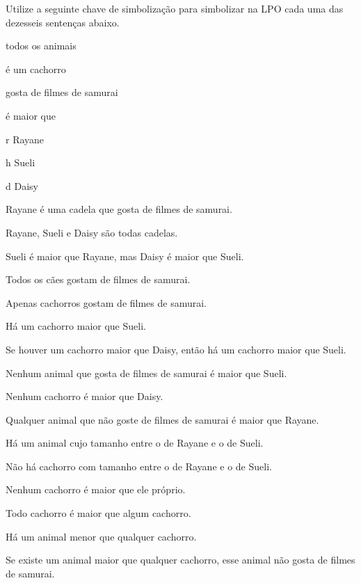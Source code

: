 \problempart 
Utilize a seguinte chave de simbolização para simbolizar na LPO cada uma das dezesseis sentenças abaixo.
\begin{center}
\begin{ekey}
\item[\text{domínio}] todos os animais
\item[\atom{C}{x}]  é um cachorro
\item[\atom{S}{x}]  gosta de filmes de samurai
\item[\atom{L}{x,y}]  é maior que 
\item[r] Rayane
\item[h] Sueli
\item[d] Daisy
\end{ekey}
\end{center}
\begin{earg}
\item Rayane é uma cadela que gosta de filmes de samurai.
\item Rayane, Sueli e Daisy são todas cadelas.
\item Sueli é maior que Rayane, mas Daisy é maior que Sueli.
\item Todos os cães gostam de filmes de samurai.
\item Apenas cachorros gostam de filmes de samurai.
\item Há um cachorro maior que Sueli.
\item Se houver um cachorro maior que Daisy, então há um cachorro maior que Sueli.
\item Nenhum animal que gosta de filmes de samurai é maior que Sueli.
\item Nenhum cachorro é maior que Daisy.
\item Qualquer animal que não goste de filmes de samurai é maior que Rayane.
\item Há um animal cujo tamanho entre o de Rayane e o de Sueli.
\item Não há cachorro com tamanho entre o de Rayane e o de Sueli.
\item Nenhum cachorro é maior que ele próprio.
\item Todo cachorro é maior que algum cachorro.
\item Há um animal menor que qualquer cachorro.
\item Se existe um animal maior que qualquer cachorro, esse animal não gosta de filmes de samurai.\end{earg}

